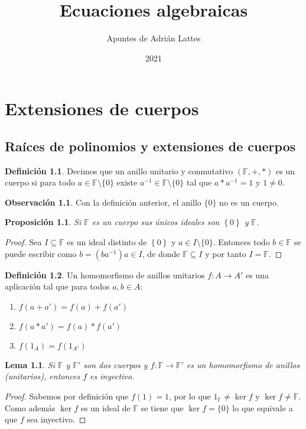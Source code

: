 \documentclass[10pt, spanish]{report}
\title{Ecuaciones algebraicas}
\author{Apuntes de Adrián Lattes}
\date{2021}
\newtheorem*{lema}{Lema}
\newtheorem*{prop}{Proposición}
\theoremstyle{definition}
\newtheorem*{defin}{Definición}
\newtheorem*{obs}{Observación}
\newcommand{\F}{\mathbb{F}}
\newcommand{\fecha}[1]{\marginpar{\underline{#1}}}
\begin{document}
\maketitle

\chapter{Extensiones de cuerpos}
\fecha{15/02}
\section{Raíces de polinomios y extensiones de cuerpos}

\begin{defin}
    Decimos que un anillo unitario y conmutativo $(\F,+,*)$ es un cuerpo si para
    todo $a\in \F\setminus\{0\}$ existe $a^{-1}\in \F\setminus\{0\}$ tal que $a*
    a^{-1}=1$ y $1\neq 0$.
\end{defin}

\begin{obs}
    Con la definición anterior, el anillo $\{0\}$ no es un cuerpo.
\end{obs}

\begin{prop}
    Si $\F$ es un cuerpo sus únicos ideales son $\left\{ 0 \right\}$ y $\F$.
\end{prop}
\begin{proof}
    Sea $I\subseteq \F$ es un ideal distinto de $\left\{ 0 \right\}$ y $a\in
    I\setminus\{0\}$. Entonces todo $b\in\F$ se puede escribir como
    $b=(ba^{-1})a\in I$, de donde $\F\subseteq I$ y por tanto $I=\F$.
\end{proof}

\begin{defin}
    Un homomorfismo de anillos unitarios $f:A\to A'$ es una aplicación tal que
    para todos $a,b\in A$:
    \begin{enumerate}
        \item $f(a+a')=f(a)+f(a')$
        \item $f(a*a')=f(a)*f(a')$
        \item $f(1_A)=f(1_{A'})$
    \end{enumerate}
\end{defin}

\begin{lema}
    Si $\F$ y $\F'$ son dos cuerpos y $f: \F\to\F'$ es un homomorfismo de
    anillos (unitarios), entonces $f$ es inyectivo.
\end{lema}
\begin{proof}
    Sabemos por definición que $f(1)=1$, por lo que $1_\F\neq \ker{f}$ y
    $\ker{f}\neq \F$. Como además $\ker{f}$ es un ideal de $\F$ se tiene que
    $\ker{f}=\{0\}$ lo que equivale a que $f$ sea inyectivo.
\end{proof}
\end{document}
